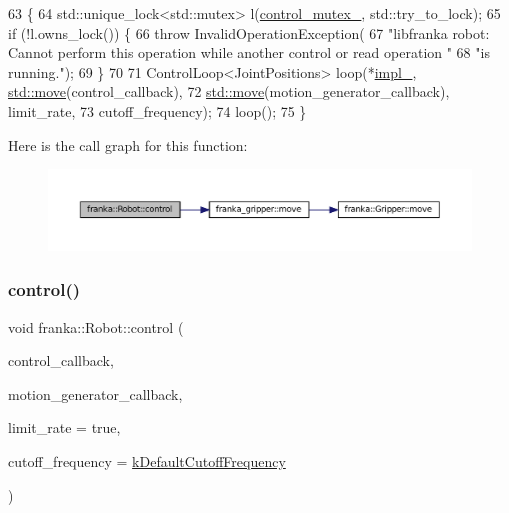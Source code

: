 \begin{DoxyCode}
63                              \{
64   std::unique\_lock<std::mutex> l(\hyperlink{classfranka_1_1Robot_a719ad1fab76f8edfc9f6f761671c1375}{control\_mutex\_}, std::try\_to\_lock);
65   \textcolor{keywordflow}{if} (!l.owns\_lock()) \{
66     \textcolor{keywordflow}{throw} InvalidOperationException(
67         \textcolor{stringliteral}{"libfranka robot: Cannot perform this operation while another control or read operation "}
68         \textcolor{stringliteral}{"is running."});
69   \}
70 
71   ControlLoop<JointPositions> loop(*\hyperlink{classfranka_1_1Robot_aca155054184e5b6478942fd6a1b82ba4}{impl\_}, \hyperlink{namespacefranka__gripper_a1356a87108d2229401d3755bd3e53bdf}{std::move}(control\_callback),
72                                    \hyperlink{namespacefranka__gripper_a1356a87108d2229401d3755bd3e53bdf}{std::move}(motion\_generator\_callback), limit\_rate,
73                                    cutoff\_frequency);
74   loop();
75 \}
\end{DoxyCode}
Here is the call graph for this function\+:
\nopagebreak
\begin{figure}[H]
\begin{center}
\leavevmode
\includegraphics[width=350pt]{classfranka_1_1Robot_a5f012ef276eb94d2a98a077bafb49bfe_cgraph}
\end{center}
\end{figure}
\mbox{\label{classfranka_1_1Robot_ab16874af2fa32c9ab901683c1666888b}} 
\subsubsection{\texorpdfstring{control()}{control()}\hspace{0.1cm}{\footnotesize\ttfamily [3/9]}}
{\footnotesize\ttfamily void franka\+::\+Robot\+::control (\begin{DoxyParamCaption}\item[{std\+::function$<$ \hyperlink{classfranka_1_1Torques}{Torques}(const \hyperlink{structfranka_1_1RobotState}{Robot\+State} \&, \hyperlink{classfranka_1_1Duration}{franka\+::\+Duration})$>$}]{control\+\_\+callback,  }\item[{std\+::function$<$ \hyperlink{classfranka_1_1JointVelocities}{Joint\+Velocities}(const \hyperlink{structfranka_1_1RobotState}{Robot\+State} \&, \hyperlink{classfranka_1_1Duration}{franka\+::\+Duration})$>$}]{motion\+\_\+generator\+\_\+callback,  }\item[{\hyperlink{classbool}{bool}}]{limit\+\_\+rate = {\ttfamily true},  }\item[{double}]{cutoff\+\_\+frequency = {\ttfamily \hyperlink{namespacefranka_ad8e3b7da346e03181ab5ac138a4171d4}{k\+Default\+Cutoff\+Frequency}} }\end{DoxyParamCaption})}

